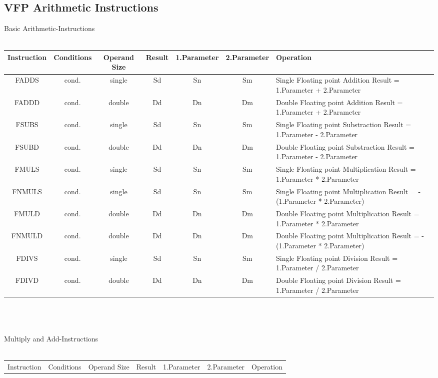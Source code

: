 \begin{landscape}
\section{VFP Arithmetic Instructions}
{\rot Basic Arithmetic-Instructions}\\
\\
\begin{tabular}{|c|c|c|c|c|c|l|}
\hline
Instruction & Conditions & Operand Size & Result & 1.Parameter & 2.Parameter & Operation\\
\hline
FADDS & cond. & single & Sd & Sn & Sm & Single Floating point Addition Result = 1.Parameter + 2.Parameter\\
\hline
FADDD & cond. & double & Dd & Dn & Dm & Double Floating point Addition Result = 1.Parameter + 2.Parameter\\
\hline
FSUBS & cond. & single & Sd & Sn & Sm & Single Floating point Substraction Result = 1.Parameter - 2.Parameter\\
\hline
FSUBD & cond. & double & Dd & Dn & Dm & Double Floating point Substraction Result = 1.Parameter - 2.Parameter\\
\hline
FMULS & cond. & single & Sd & Sn & Sm & Single Floating point Multiplication Result = 1.Parameter * 2.Parameter\\
\hline
FNMULS & cond. & single & Sd & Sn & Sm & Single Floating point Multiplication Result = -(1.Parameter * 2.Parameter)\\
\hline
FMULD & cond. & double & Dd & Dn & Dm & Double Floating point Multiplication Result = 1.Parameter * 2.Parameter\\
\hline
FNMULD & cond. & double & Dd & Dn & Dm & Double Floating point Multiplication Result = -(1.Parameter * 2.Parameter)\\
\hline
FDIVS & cond. & single & Sd & Sn & Sm & Single Floating point Division Result = 1.Parameter / 2.Parameter\\
\hline
FDIVD & cond. & double & Dd & Dn & Dm & Double Floating point Division Result = 1.Parameter / 2.Parameter\\
\hline
\end{tabular}\\
\\
\\
{\rot Multiply and Add-Instructions}\\
\\
\begin{tabular}{|c|c|c|c|c|c|l|}
\hline
Instruction & Conditions & Operand Size & Result & 1.Parameter & 2.Parameter & Operation\\

\end{tabular}
\end{landscape}
